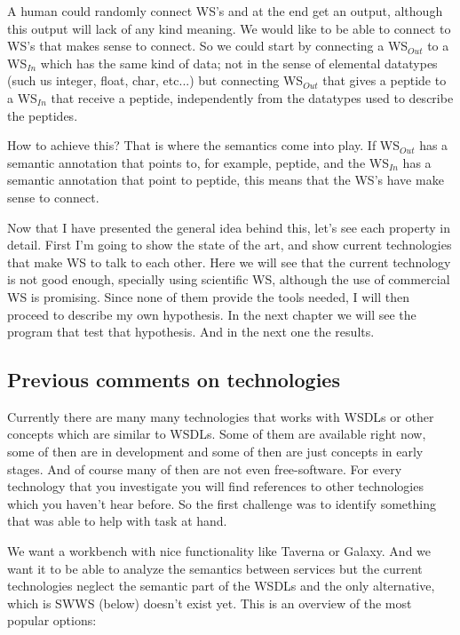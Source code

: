 \documentclass[a4paper,10pt]{article}
\begin{document}
  A human could randomly connect WS's and at the end get an output, although this output will lack of any kind meaning.  We would like to be able to connect to WS's that makes sense to connect. So we could start by connecting a WS$_{Out}$ to a WS$_{In}$ which has the same kind of data; not in the sense of elemental datatypes (such us integer, float, char, etc...) but connecting WS$_{Out}$ that gives a peptide to a WS$_{In}$ that receive a peptide, independently from the datatypes used to describe the peptides.\vspace{3 mm}

  How to achieve this? That is where the semantics come into play. If WS$_{Out}$ has a semantic annotation that points to, for example, peptide, and the WS$_{In}$ has a semantic annotation that point to peptide, this means that the WS's have make sense to connect.\vspace{3 mm}

  Now that I have presented the general idea behind this, let's see each property in detail. First I'm going to show the state of the art, and show current technologies that make WS to talk to each other. Here we will see that the current technology is not good enough, specially using scientific WS, although the use of commercial WS is promising. Since none of them provide the tools needed, I will then proceed to describe my own hypothesis. In the next chapter we will see the program that test that hypothesis. And in the next one the results.

  \subsection{Previous comments on technologies}
  \label{sec:otherTechs}

  Currently there are many many technologies that works with WSDLs or other concepts which are similar to WSDLs. Some of them are available right now, some of then are in development and some of then are just concepts in early stages. And of course many of then are not even free-software. For every technology that you investigate you will find references to other technologies which you haven't hear before. So the first challenge was to identify something that was able to help with task at hand. \vspace{3 mm} 

  We want a workbench with nice functionality like Taverna or Galaxy. And we want it to be able to analyze the semantics between services but the current technologies neglect the semantic part of the WSDLs and the only alternative, which is SWWS (below) doesn't exist yet. This is an overview of the most popular options:\vspace{3 mm}
\end{document}

